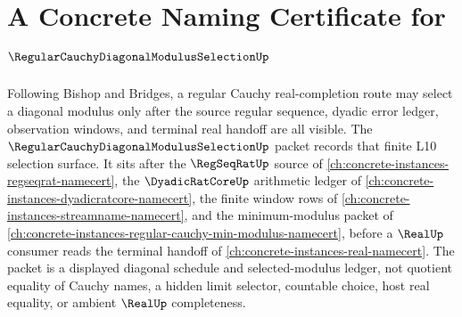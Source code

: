 \chapter{A Concrete Naming Certificate for $\RegularCauchyDiagonalModulusSelectionUp$}
\label{ch:concrete-instances-regular-cauchy-diagonal-modulus-selection-namecert}

Following Bishop and Bridges, a regular Cauchy real-completion route may select a diagonal modulus only after the source regular sequence, dyadic error ledger, observation windows, and terminal real handoff are all visible. The $\RegularCauchyDiagonalModulusSelectionUp$ packet records that finite L10 selection surface. It sits after the $\RegSeqRatUp$ source of \autoref{ch:concrete-instances-regseqrat-namecert}, the $\DyadicRatCoreUp$ arithmetic ledger of \autoref{ch:concrete-instances-dyadicratcore-namecert}, the finite window rows of \autoref{ch:concrete-instances-streamname-namecert}, and the minimum-modulus packet of \autoref{ch:concrete-instances-regular-cauchy-min-modulus-namecert}, before a $\RealUp$ consumer reads the terminal handoff of \autoref{ch:concrete-instances-real-namecert}. The packet is a displayed diagonal schedule and selected-modulus ledger, not quotient equality of Cauchy names, a hidden limit selector, countable choice, host real equality, or ambient $\RealUp$ completeness.

